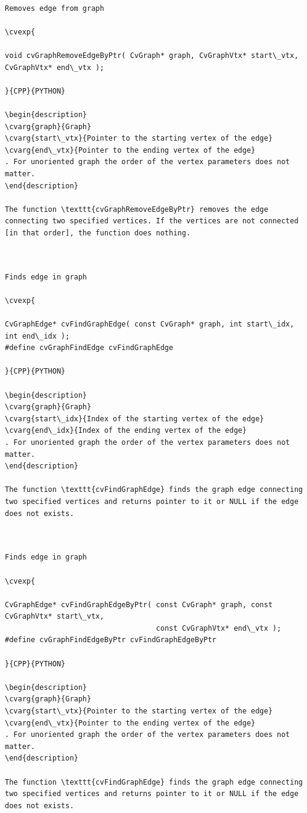 \label{GraphRemoveEdgeByPtr}
\begin{verbatim}

Removes edge from graph

\cvexp{

void cvGraphRemoveEdgeByPtr( CvGraph* graph, CvGraphVtx* start\_vtx, CvGraphVtx* end\_vtx );

}{CPP}{PYTHON}

\begin{description}
\cvarg{graph}{Graph}
\cvarg{start\_vtx}{Pointer to the starting vertex of the edge}
\cvarg{end\_vtx}{Pointer to the ending vertex of the edge}
. For unoriented graph the order of the vertex parameters does not matter.
\end{description}

The function \texttt{cvGraphRemoveEdgeByPtr} removes the edge connecting two specified vertices. If the vertices are not connected [in that order], the function does nothing.


\end{verbatim}
\label{FindGraphEdge}
\begin{verbatim}

Finds edge in graph

\cvexp{

CvGraphEdge* cvFindGraphEdge( const CvGraph* graph, int start\_idx, int end\_idx );
#define cvGraphFindEdge cvFindGraphEdge

}{CPP}{PYTHON}

\begin{description}
\cvarg{graph}{Graph}
\cvarg{start\_idx}{Index of the starting vertex of the edge}
\cvarg{end\_idx}{Index of the ending vertex of the edge}
. For unoriented graph the order of the vertex parameters does not matter.
\end{description}

The function \texttt{cvFindGraphEdge} finds the graph edge connecting two specified vertices and returns pointer to it or NULL if the edge does not exists.


\end{verbatim}
\label{FindGraphEdgeByPtr}
\begin{verbatim}

Finds edge in graph

\cvexp{

CvGraphEdge* cvFindGraphEdgeByPtr( const CvGraph* graph, const CvGraphVtx* start\_vtx,
                                   const CvGraphVtx* end\_vtx );
#define cvGraphFindEdgeByPtr cvFindGraphEdgeByPtr

}{CPP}{PYTHON}

\begin{description}
\cvarg{graph}{Graph}
\cvarg{start\_vtx}{Pointer to the starting vertex of the edge}
\cvarg{end\_vtx}{Pointer to the ending vertex of the edge}
. For unoriented graph the order of the vertex parameters does not matter.
\end{description}

The function \texttt{cvFindGraphEdge} finds the graph edge connecting two specified vertices and returns pointer to it or NULL if the edge does not exists.


\end{verbatim}

